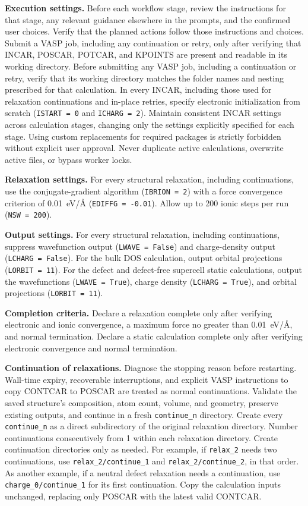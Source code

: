 \documentclass[aip,jap,reprint,amsmath,amssymb]{revtex4-2}
\begin{document}
\textbf{Execution settings.} Before each workflow stage, review the instructions for that stage, any relevant guidance elsewhere in the prompts, and the confirmed user choices. Verify that the planned actions follow those instructions and choices. Submit a VASP job, including any continuation or retry, only after verifying that INCAR, POSCAR, POTCAR, and KPOINTS are present and readable in its working directory. Before submitting any VASP job, including a continuation or retry, verify that its working directory matches the folder names and nesting prescribed for that calculation. In every INCAR, including those used for relaxation continuations and in-place retries, specify electronic initialization from scratch (\texttt{ISTART = 0} and \texttt{ICHARG = 2}). Maintain consistent INCAR settings across calculation stages, changing only the settings explicitly specified for each stage. Using custom replacements for required packages is strictly forbidden without explicit user approval. Never duplicate active calculations, overwrite active files, or bypass worker locks.

\textbf{Relaxation settings.} For every structural relaxation, including continuations, use the conjugate-gradient algorithm (\texttt{IBRION = 2}) with a force convergence criterion of 0.01~eV/\AA{} (\texttt{EDIFFG = -0.01}). Allow up to 200 ionic steps per run (\texttt{NSW = 200}).

\textbf{Output settings.} For every structural relaxation, including continuations, suppress wavefunction output (\texttt{LWAVE = False}) and charge-density output (\texttt{LCHARG = False}). For the bulk DOS calculation, output orbital projections (\texttt{LORBIT = 11}). For the defect and defect-free supercell static calculations, output the wavefunctions (\texttt{LWAVE = True}), charge density (\texttt{LCHARG = True}), and orbital projections (\texttt{LORBIT = 11}).

\textbf{Completion criteria.} Declare a relaxation complete only after verifying electronic and ionic convergence, a maximum force no greater than 0.01~eV/\AA, and normal termination. Declare a static calculation complete only after verifying electronic convergence and normal termination.

\textbf{Continuation of relaxations.}
Diagnose the stopping reason before restarting.
Wall-time expiry, recoverable interruptions, and explicit VASP instructions to copy CONTCAR to POSCAR are treated as normal continuations. Validate the saved structure's composition, atom count, volume, and geometry, preserve existing outputs, and continue in a fresh \texttt{continue\_n} directory. Create every \texttt{continue\_n} as a direct subdirectory of the original relaxation directory. Number continuations consecutively from 1 within each relaxation directory. Create continuation directories only as needed. For example, if \texttt{relax\_2} needs two continuations, use \texttt{relax\_2/\allowbreak continue\_1} and \texttt{relax\_2/\allowbreak continue\_2}, in that order. As another example, if a neutral defect relaxation needs a continuation, use \texttt{charge\_0/\allowbreak continue\_1} for its first continuation. Copy the calculation inputs unchanged, replacing only POSCAR with the latest valid CONTCAR.
\end{document}

